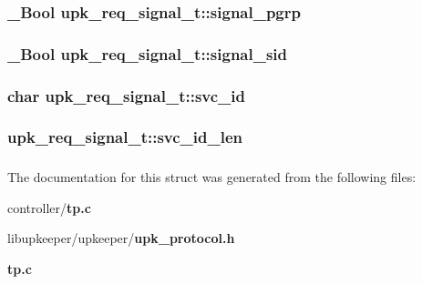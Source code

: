\subsubsection[{signal\_\-pgrp}]{\setlength{\rightskip}{0pt plus 5cm}\_\-Bool {\bf upk\_\-req\_\-signal\_\-t::signal\_\-pgrp}}\label{structupk__req__signal__t_a904af86f4fe3252784aeb07892cee809}
\subsubsection[{signal\_\-sid}]{\setlength{\rightskip}{0pt plus 5cm}\_\-Bool {\bf upk\_\-req\_\-signal\_\-t::signal\_\-sid}}\label{structupk__req__signal__t_a139018324601264c9f8d5a3b0320df7f}
\subsubsection[{svc\_\-id}]{\setlength{\rightskip}{0pt plus 5cm}char {\bf upk\_\-req\_\-signal\_\-t::svc\_\-id}}\label{structupk__req__signal__t_abc71496c45d57d3ade488811c6622ca8}
\subsubsection[{svc\_\-id\_\-len}]{ {\bf upk\_\-req\_\-signal\_\-t::svc\_\-id\_\-len}}\label{structupk__req__signal__t_ae757574fb40ba7a8ea06079957fb491b}
\subsubsection[{UPK\_\-V0\_\-REQ\_\-SIGNAL\_\-T\_\-FIELDS}]{}\label{structupk__req__signal__t_ab7fb5ea2d5f44e08782fae707d7b516f}


The documentation for this struct was generated from the following files:\begin{DoxyCompactItemize}
\item 
controller/{\bf tp.c}\item 
libupkeeper/upkeeper/{\bf upk\_\-protocol.h}\item 
{\bf tp.c}\end{DoxyCompactItemize}

